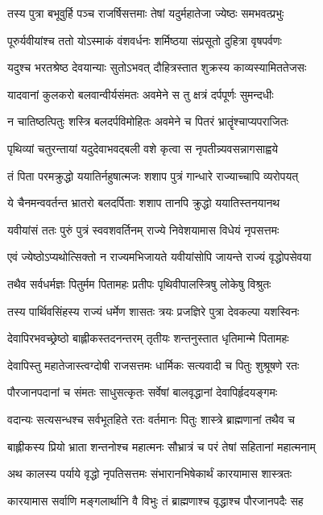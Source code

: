 \twolineshloka
{तस्य पुत्रा बभूवुर्हि पञ्च राजर्षिसत्तमाः}
{तेषां यदुर्महातेजा ज्येष्ठः समभवत्प्रभुः}


\twolineshloka
{पूरुर्यवीयांश्च ततो योऽस्माकं वंशवर्धनः}
{शर्मिष्ठया संप्रसूतो दुहित्रा वृषपर्वणः}


\twolineshloka
{यदुश्च भरतश्रेष्ठ देवयान्याः सुतोऽभवत्}
{दौहित्रस्तात शुक्रस्य काव्यस्यामिततेजसः}


\twolineshloka
{यादवानां कुलकरो बलवान्वीर्यसंमतः}
{अवमेने स तु क्षत्रं दर्पपूर्णः सुमन्दधीः}


\twolineshloka
{न चातिष्ठत्पितुः शस्त्रि बलदर्पविमोहितः}
{अवमेने च पितरं भ्रातॄंश्चाप्यपराजितः}


\twolineshloka
{पृथिव्यां चतुरन्तायां यदुदेवाभवद्बली}
{वशे कृत्वा स नृपतीन्न्यवसन्नागसाह्वये}


\twolineshloka
{तं पिता परमक्रुद्धो ययातिर्नहुषात्मजः}
{शशाप पुत्रं गान्धारे राज्याच्चापि व्यरोपयत्}


\twolineshloka
{ये चैनमन्ववर्तन्त भ्रातरो बलदर्पिताः}
{शशाप तानपि क्रुद्धो ययातिस्तनयानथ}


\twolineshloka
{यवीयांसं ततः पुरुं पुत्रं स्ववशवर्तिनम्}
{राज्ये निवेशयामास विधेयं नृपसत्तमः}


\twolineshloka
{एवं ज्येष्ठोऽप्यथोत्सिक्तो न राज्यमभिजायते}
{यवीयांसोपि जायन्ते राज्यं वृद्धोपसेवया}


\twolineshloka
{तथैव सर्वधर्मज्ञः पितुर्मम पितामहः}
{प्रतीपः पृथिवीपालस्त्रिषु लोकेषु विश्रुतः}


\twolineshloka
{तस्य पार्थिवसिंहस्य राज्यं धर्मेण शासतः}
{त्रयः प्रजज्ञिरे पुत्रा देवकल्पा यशस्विनः}


\twolineshloka
{देवापिरभवच्छ्रेष्ठो बाह्लीकस्तदनन्तरम्}
{तृतीयः शन्तनुस्तात धृतिमान्मे पितामहः}


\twolineshloka
{देवापिस्तु महातेजास्त्वग्दोषी राजसत्तमः}
{धार्मिकः सत्यवादी च पितुः शुश्रूषणे रतः}


\twolineshloka
{पौरजानपदानां च संमतः साधुसत्कृतः}
{सर्वेषां बालवृद्धानां देवापिर्हृदयङ्गमः}


\twolineshloka
{वदान्यः सत्यसन्धश्च सर्वभूतहिते रतः}
{वर्तमानः पितुः शास्त्रे ब्राह्मणानां तथैव च}


\twolineshloka
{बाह्लीकस्य प्रियो भ्राता शन्तनोश्च महात्मनः}
{सौभ्रात्रं च परं तेषां सहितानां महात्मनाम्}


\twolineshloka
{अथ कालस्य पर्याये वृद्धो नृपतिसत्तमः}
{संभारानभिषेकार्थं कारयामास शास्त्रतः}


\twolineshloka
{कारयामास सर्वाणि मङ्गलार्थानि वै विभुः}
{तं ब्राह्मणाश्च वृद्धाश्च पौरजानपदैः सह}


